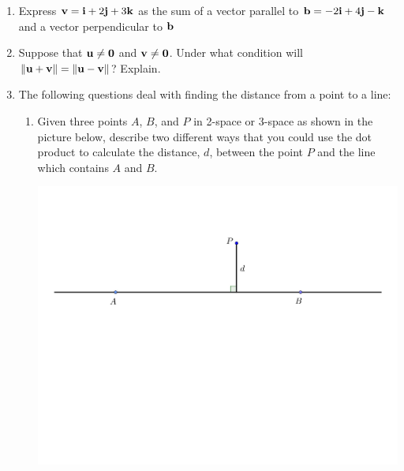 \documentclass[12pt]{article}
\newif\ifans
\begin{document}
\begin{enumerate}
\begin{enumerate}
\end{enumerate}

\item Express ${\bf v}={\bf i}+2{\bf j}+3{\bf k}$ as the sum of a vector parallel to ${\bf b}=-2{\bf i}+4{\bf j}-{\bf k}$ and a vector perpendicular to ${\bf b}$

\ifans{\fbox{${\bf v}=\left\langle-\frac{2}{7},\frac{4}{7},-\frac{1}{7}\right\rangle+\left\langle \frac{9}{7},\frac{10}{7},\frac{22}{7}\right\rangle$}} \fi

\item Suppose that ${\bf u} \neq {\bf 0}$ and ${\bf v} \neq {\bf 0}$.  Under what condition will $\|{\bf u}+{\bf v}\|=\|{\bf u}-{\bf v}\|$?  Explain.

\ifans{\fbox{The result follows if ${\bf u}$ is orthogonal to ${\bf v}$.}} \fi

\item The following questions deal with finding the distance from a point to a line:

\begin{enumerate}

\item Given three points $A$, $B$, and $P$ in 2-space or 3-space as shown in the picture below, describe two different ways that you could use the dot product to calculate the distance, $d$, between the point $P$ and the line which contains $A$ and $B$.

\begin{center}
\includegraphics[scale=0.5]{length.pdf}
\end{center}


\end{enumerate}
\end{enumerate}
\end{document}
